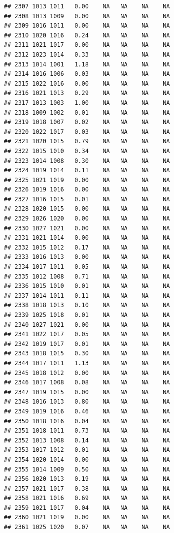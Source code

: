 \documentclass{article}\usepackage{graphicx, color}
\makeatletter
\newenvironment{kframe}{%
 \def\at@end@of@kframe{}%
 \ifinner\ifhmode%
  \def\at@end@of@kframe{\end{minipage}}%
  \begin{minipage}{\columnwidth}%
 \fi\fi%
 \def\FrameCommand##1{\hskip\@totalleftmargin \hskip-\fboxsep
 \colorbox{shadecolor}{##1}\hskip-\fboxsep
     \hskip-\linewidth \hskip-\@totalleftmargin \hskip\columnwidth}%
 \MakeFramed {\advance\hsize-\width
   \@totalleftmargin\z@ \linewidth\hsize
   \@setminipage}}%
 {\par\unskip\endMakeFramed%
 \at@end@of@kframe}
\newenvironment{knitrout}{}{} %
\makeatother
\begin{document}
\begin{knitrout}
\begin{kframe}
\begin{verbatim}
## 2307 1013 1011   0.00    NA   NA    NA    NA
## 2308 1013 1009   0.00    NA   NA    NA    NA
## 2309 1016 1011   0.00    NA   NA    NA    NA
## 2310 1020 1016   0.24    NA   NA    NA    NA
## 2311 1021 1017   0.00    NA   NA    NA    NA
## 2312 1023 1014   0.33    NA   NA    NA    NA
## 2313 1014 1001   1.18    NA   NA    NA    NA
## 2314 1016 1006   0.03    NA   NA    NA    NA
## 2315 1022 1016   0.00    NA   NA    NA    NA
## 2316 1021 1013   0.29    NA   NA    NA    NA
## 2317 1013 1003   1.00    NA   NA    NA    NA
## 2318 1009 1002   0.01    NA   NA    NA    NA
## 2319 1018 1007   0.02    NA   NA    NA    NA
## 2320 1022 1017   0.03    NA   NA    NA    NA
## 2321 1020 1015   0.79    NA   NA    NA    NA
## 2322 1015 1010   0.34    NA   NA    NA    NA
## 2323 1014 1008   0.30    NA   NA    NA    NA
## 2324 1019 1014   0.11    NA   NA    NA    NA
## 2325 1021 1019   0.00    NA   NA    NA    NA
## 2326 1019 1016   0.00    NA   NA    NA    NA
## 2327 1016 1015   0.01    NA   NA    NA    NA
## 2328 1020 1015   0.00    NA   NA    NA    NA
## 2329 1026 1020   0.00    NA   NA    NA    NA
## 2330 1027 1021   0.00    NA   NA    NA    NA
## 2331 1021 1014   0.00    NA   NA    NA    NA
## 2332 1015 1012   0.17    NA   NA    NA    NA
## 2333 1016 1013   0.00    NA   NA    NA    NA
## 2334 1017 1011   0.05    NA   NA    NA    NA
## 2335 1012 1008   0.71    NA   NA    NA    NA
## 2336 1015 1010   0.01    NA   NA    NA    NA
## 2337 1014 1011   0.11    NA   NA    NA    NA
## 2338 1018 1013   0.10    NA   NA    NA    NA
## 2339 1025 1018   0.01    NA   NA    NA    NA
## 2340 1027 1021   0.00    NA   NA    NA    NA
## 2341 1022 1017   0.05    NA   NA    NA    NA
## 2342 1019 1017   0.01    NA   NA    NA    NA
## 2343 1018 1015   0.30    NA   NA    NA    NA
## 2344 1017 1011   1.13    NA   NA    NA    NA
## 2345 1018 1012   0.00    NA   NA    NA    NA
## 2346 1017 1008   0.08    NA   NA    NA    NA
## 2347 1019 1015   0.00    NA   NA    NA    NA
## 2348 1016 1013   0.80    NA   NA    NA    NA
## 2349 1019 1016   0.46    NA   NA    NA    NA
## 2350 1018 1016   0.04    NA   NA    NA    NA
## 2351 1018 1011   0.73    NA   NA    NA    NA
## 2352 1013 1008   0.14    NA   NA    NA    NA
## 2353 1017 1012   0.01    NA   NA    NA    NA
## 2354 1020 1014   0.00    NA   NA    NA    NA
## 2355 1014 1009   0.50    NA   NA    NA    NA
## 2356 1020 1013   0.19    NA   NA    NA    NA
## 2357 1021 1017   0.38    NA   NA    NA    NA
## 2358 1021 1016   0.69    NA   NA    NA    NA
## 2359 1021 1017   0.04    NA   NA    NA    NA
## 2360 1021 1019   0.00    NA   NA    NA    NA
## 2361 1025 1020   0.07    NA   NA    NA    NA

\end{verbatim}
\end{kframe}
\end{knitrout}
\end{document}
